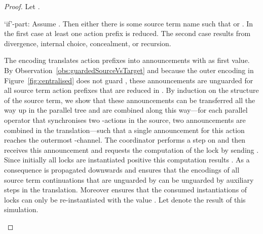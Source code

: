 \documentclass[]{eptcs}
\begin{document}
\begin{proof}
	Let .
	\begin{compactitem}
		\item[`if'-part:] Assume . Then either there is some source term name  such that  or . In the first case at least one action prefix  is reduced. The second case results from divergence, internal choice, concealment, or recursion.
			\begin{compactenum}
				\item The encoding translates action prefixes  into announcements with  as first value. By Observation~\ref{obs:guardedSourceVsTarget} and because the outer encoding in Figure~\ref{fig:centralised} does not guard , these announcements are unguarded for all source term action prefixes that are reduced in . By induction on the structure of the source term, we show that these announcements can be transferred all the way up in the parallel tree and are combined along this way---for each parallel operator that synchronises two -actions in the source, two announcements are combined in the translation---such that a single announcement for this action reaches the outermost -channel. The coordinator performs a step on  and then receives this announcement and requests the computation of the lock by sending . Since initially all locks are instantiated positive this computation results . As a consequence  is propagated downwards and ensures that the encodings of all source term continuations that are unguarded by  can be unguarded by auxiliary steps in the translation.
					Moreover  ensures that the consumed instantiations of locks can only be re-instantiated with the value . Let  denote the result of this simulation.
					

\end{compactenum}
\end{compactitem}
\end{proof}
\end{document}
